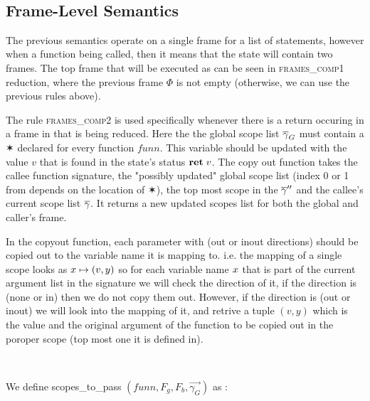 \documentclass[UTF8]{article}
\begin{document}
\begin{figure}[ht!]
    \ottusedrule{\ottdrulestmtXXverifyXXThree{}} \\
    \ottusedrule{\ottdrulestmtXXverifyXXFour{}} 
\end{figure}



\subsection{Frame-Level Semantics}
The previous semantics operate on a single frame for a list of statements, however when a function being called, then it means that the state will contain two frames. The top frame that will be executed as can be seen in \textsc{frames\_comp1} reduction, where the previous frame $\Phi$ is not empty (otherwise, we can use the previous rules above). 

The rule \textsc{frames\_comp2} is used specifically whenever there is a return occuring in a frame in that is being reduced. Here the the global scope list $\overline{\gamma}_G$ must contain a $\varstar$ declared for every function $funn$. This variable should be updated with the value $v$ that is found in the state's status $\textbf{ret}\;v$. The copy out function takes the callee function signature, the "possibly updated" global scope list (index 0 or 1 from depends on the location of $\varstar{}$), the top most scope in the $\overline{\gamma}''$ and the callee's current scope list $\overline{\gamma}$. It returns a new updated scopes list for both the global and caller's frame.

In the copyout function, each parameter with (out or inout directions) should be copied out to the variable name it is mapping to. i.e. the mapping of a single scope looks as  $ x \mapsto (v , y) $ so for each variable name $x$ that is part of the current argument list in the signature we will check the direction of it, if the direction is (none or in) then we do not copy them out. However, if the direction is (out or inout) we will look into the mapping of it, and retrive a tuple $(v,y)$ which is the value and the original argument of the function to be copied out in the poroper scope (top most one it is defined in).


\begin{figure}[ht!]
    \ottusedrule{\ottdruleframesXXcompOne{}} \\
    \ottusedrule{\ottdruleframesXXcompTwo{}}
\end{figure}


We define scopes\_to\_pass $ ( funn, F_g , F_b , \overrightarrow{\gamma_G}) $ as : \vspace{10pt}
\end{document}
